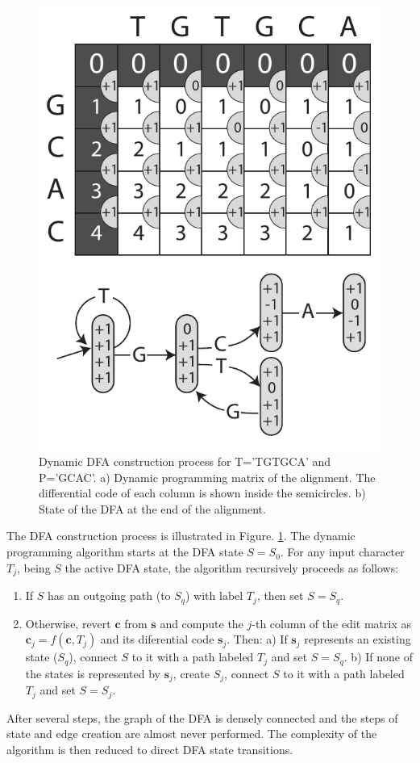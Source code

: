 \documentclass{bioinfo}
\begin{document}
\begin{methods}
\begin{figure}[!tpb]
\centerline{\includegraphics[scale=0.6]{Figure_1.pdf}}
\caption{Dynamic DFA construction process for T='TGTGCA' and P='GCAC'.
a) Dynamic programming matrix of the alignment. The differential code
of each column is shown inside the semicircles. b) State of the DFA at
the end of the alignment.}\label{matrix}
\end{figure}

The DFA construction process is illustrated in Figure. \ref{matrix}. The
dynamic programming algorithm starts at the DFA state
$S = S_0$. For any input character $T_j$, being $S$
the active DFA state, the algorithm recursively proceeds as follows:
\begin{enumerate}
\item If $S$ has an outgoing path (to $S_q$) with
label $T_j$, then set $S = S_q$.
\item Otherwise, revert $\mathbf{c}$ from $\mathbf{s}$ and compute
the $j$-th column of the edit matrix as $\mathbf{c}_j = f(\mathbf{c}, T_j)$ and
its diferential code $\mathbf{s}_j$. Then: a) If $\mathbf{s}_j$
represents an existing state ($S_q$), connect $S$ to it with a path
labeled $T_j$ and set $S = S_q$. b) If none of the states is
represented by $\mathbf{s}_j$, create $S_j$, connect $S$ to it with a
path labeled $T_j$ and set $S = S_j$.
\end{enumerate}

After several steps, the graph of the DFA is densely connected and
the steps of state and edge creation are almost never performed. 
The complexity of the algorithm is then reduced to direct DFA state
transitions.

\end{methods}
\end{document}
